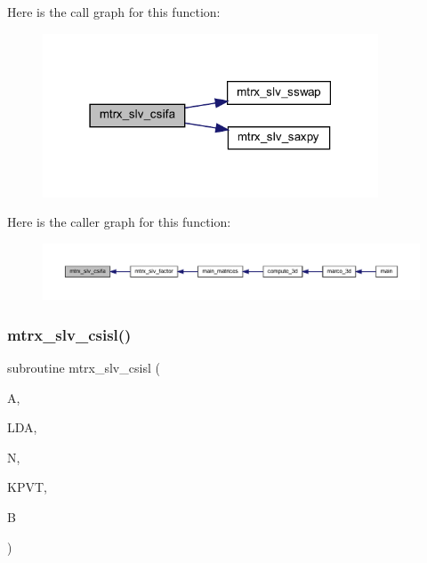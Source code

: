 Here is the call graph for this function\+:
\nopagebreak
\begin{figure}[H]
\begin{center}
\leavevmode
\includegraphics[width=283pt]{Marco_8f90_ac6e18477fef3905abe6474ab133dcfaa_cgraph}
\end{center}
\end{figure}
Here is the caller graph for this function\+:
\nopagebreak
\begin{figure}[H]
\begin{center}
\leavevmode
\includegraphics[width=350pt]{Marco_8f90_ac6e18477fef3905abe6474ab133dcfaa_icgraph}
\end{center}
\end{figure}
\mbox{\label{Marco_8f90_a0ecd03824aa01555ad345a3140e4286a}} 
\subsubsection{\texorpdfstring{mtrx\+\_\+slv\+\_\+csisl()}{mtrx\_slv\_csisl()}}
{\footnotesize\ttfamily subroutine mtrx\+\_\+slv\+\_\+csisl (\begin{DoxyParamCaption}\item[{complex, dimension(lda,n)}]{A,  }\item[{integer}]{L\+DA,  }\item[{integer}]{N,  }\item[{integer, dimension(n)}]{K\+P\+VT,  }\item[{complex, dimension(n)}]{B }\end{DoxyParamCaption})}

